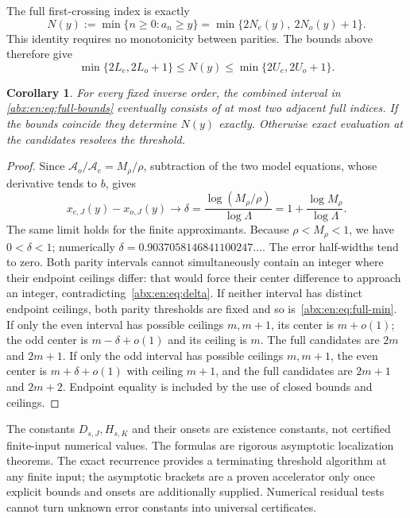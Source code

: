\documentclass[11pt,letterpaper]{article}
\numberwithin{equation}{section}
\newtheorem{corollary}[theorem]{Corollary}
\theoremstyle{remark}\newtheorem{remark}[theorem]{Remark}
\begin{document}
The full first-crossing index is exactly
\begin{equation}\label{abx:en:eq:full-min}
 N(y):=\min\{n\ge0:a_n\ge y\}
       =\min\{2N_e(y),\ 2N_o(y)+1\}.
\end{equation}
This identity requires no monotonicity between parities. The bounds
above therefore give
\begin{equation}\label{abx:en:eq:full-bounds}
 \min\{2L_e,2L_o+1\}\le N(y)\le
 \min\{2U_e,2U_o+1\}.
\end{equation}

\begin{corollary}\label{abx:en:cor:adjacent}
For every fixed inverse order, the combined interval in
\eqref{abx:en:eq:full-bounds} eventually consists of at most two adjacent
full indices. If the bounds coincide they determine $N(y)$ exactly.
Otherwise exact evaluation at the candidates resolves the threshold.
\end{corollary}
\begin{proof}
Since $\mathcal A_o/\mathcal A_e=M_\rho/\rho$, subtraction of
the two model equations, whose derivative tends to $b$, gives
\begin{equation}\label{abx:en:eq:delta}
 x_{e,J}(y)-x_{o,J}(y)\longrightarrow
 \delta=\frac{\log(M_\rho/\rho)}{\log\Lambda}
       =1+\frac{\log M_\rho}{\log\Lambda}.
\end{equation}
The same limit holds for the finite approximants. Because
$\rho<M_\rho<1$, we have $0<\delta<1$; numerically
$\delta=0.9037058146841100247\ldots$.
The error half-widths tend to zero. Both parity intervals cannot
simultaneously contain an integer where their endpoint ceilings differ:
that would force their center difference to approach an integer,
contradicting~\eqref{abx:en:eq:delta}.
If neither interval has distinct endpoint ceilings, both parity
thresholds are fixed and so is~\eqref{abx:en:eq:full-min}. If only the even
interval has possible ceilings $m,m+1$, its center is $m+o(1)$;
the odd center is $m-\delta+o(1)$ and its ceiling is $m$.
The full candidates are $2m$ and $2m+1$. If only the odd interval
has possible ceilings $m,m+1$, the even center is
$m+\delta+o(1)$ with ceiling $m+1$, and the full candidates are
$2m+1$ and $2m+2$. Endpoint equality is included by the use of
closed bounds and ceilings.
\end{proof}
The constants $D_{s,J},H_{s,K}$ and their onsets are existence
constants, not certified finite-input numerical values. The formulas
are rigorous asymptotic localization theorems. The exact recurrence
provides a terminating threshold algorithm at any finite input;
the asymptotic brackets are a proven accelerator only once explicit
bounds and onsets are additionally supplied. Numerical residual tests
cannot turn unknown error constants into universal certificates.
\end{document}
